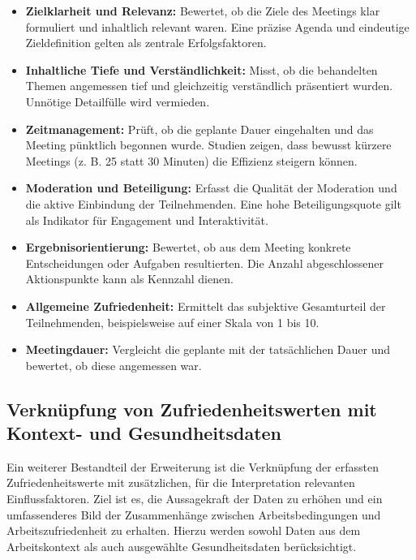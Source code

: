 \documentclass[12pt,a4paper]{report}
\begin{document}
\begin{itemize}
  \item \textbf{Zielklarheit und Relevanz:} Bewertet, ob die Ziele des Meetings klar formuliert und inhaltlich relevant waren. 
    Eine präzise Agenda und eindeutige Zieldefinition gelten als zentrale Erfolgsfaktoren.

  \item \textbf{Inhaltliche Tiefe und Verständlichkeit:} Misst, ob die behandelten Themen angemessen tief und gleichzeitig 
    verständlich präsentiert wurden. Unnötige Detailfülle wird vermieden.

  \item \textbf{Zeitmanagement:} Prüft, ob die geplante Dauer eingehalten und das Meeting pünktlich begonnen wurde. Studien 
    zeigen, dass bewusst kürzere Meetings (z. B. 25 statt 30 Minuten) die Effizienz steigern können.

  \item \textbf{Moderation und Beteiligung:} Erfasst die Qualität der Moderation und die aktive Einbindung der Teilnehmenden. 
    Eine hohe Beteiligungsquote gilt als Indikator für Engagement und Interaktivität.

  \item \textbf{Ergebnisorientierung:} Bewertet, ob aus dem Meeting konkrete Entscheidungen oder Aufgaben resultierten. Die Anzahl 
    abgeschlossener Aktionspunkte kann als Kennzahl dienen.

  \item \textbf{Allgemeine Zufriedenheit:} Ermittelt das subjektive Gesamturteil der Teilnehmenden, beispielsweise auf einer 
    Skala von 1 bis 10.

  \item \textbf{Meetingdauer:} Vergleicht die geplante mit der tatsächlichen Dauer und bewertet, ob diese angemessen war.
\end{itemize}

\subsection{Verknüpfung von Zufriedenheitswerten mit Kontext- und Gesundheitsdaten}

Ein weiterer Bestandteil der Erweiterung ist die Verknüpfung der erfassten Zufriedenheitswerte mit zusätzlichen, für die
Interpretation relevanten Einflussfaktoren. Ziel ist es, die Aussagekraft der Daten zu erhöhen und ein umfassenderes Bild der
Zusammenhänge zwischen Arbeitsbedingungen und Arbeitszufriedenheit zu erhalten. Hierzu werden sowohl Daten aus dem Arbeitskontext
als auch ausgewählte Gesundheitsdaten berücksichtigt.
\end{document}
